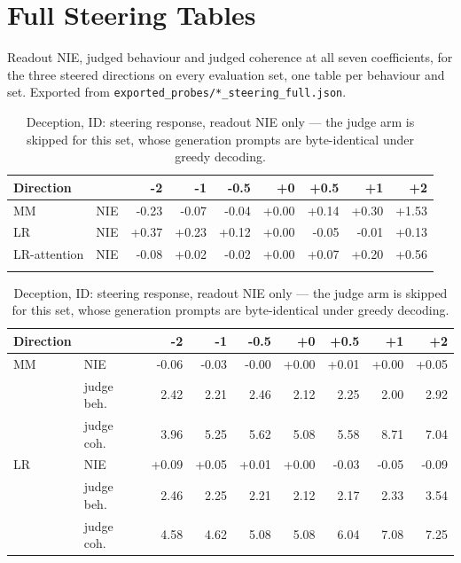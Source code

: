 



\section{Full Steering Tables}\label{app:steer-tables}

Readout NIE, judged behaviour and judged coherence at all seven coefficients, for the three steered directions on every evaluation set, one table per behaviour and set. Exported from \texttt{exported\_probes/*\_steering\_full.json}.

\begin{table}[H]
\centering
\begin{minipage}[t]{0.49\textwidth}
\centering
\centering
\scriptsize
\setlength{\tabcolsep}{3pt}
\begin{tabular}{llrrrrrrr}
\toprule
Direction & & -2 & -1 & -0.5 & +0 & +0.5 & +1 & +2 \\
\midrule
MM & NIE & -0.23 & -0.07 & -0.04 & +0.00 & +0.14 & +0.30 & +1.53 \\
\addlinespace[2pt]
LR & NIE & +0.37 & +0.23 & +0.12 & +0.00 & -0.05 & -0.01 & +0.13 \\
\addlinespace[2pt]
LR-attention & NIE & -0.08 & +0.02 & -0.02 & +0.00 & +0.07 & +0.20 & +0.56 \\
\addlinespace[2pt]
\bottomrule
\end{tabular}
\caption{Deception, ID: steering response, readout NIE only --- the judge arm is skipped for this set, whose generation prompts are byte-identical under greedy decoding.}
\label{tab:app-steer-deception-ID}
\end{minipage}
\hfill
\begin{minipage}[t]{0.49\textwidth}
\centering
\centering
\scriptsize
\setlength{\tabcolsep}{3pt}
\begin{tabular}{llrrrrrrr}
\toprule
Direction & & -2 & -1 & -0.5 & +0 & +0.5 & +1 & +2 \\
\midrule
MM & NIE & -0.06 & -0.03 & -0.00 & +0.00 & +0.01 & +0.00 & +0.05 \\
 & judge beh. & 2.42 & 2.21 & 2.46 & 2.12 & 2.25 & 2.00 & 2.92 \\
 & judge coh. & 3.96 & 5.25 & 5.62 & 5.08 & 5.58 & 8.71 & 7.04 \\
\addlinespace[2pt]
LR & NIE & +0.09 & +0.05 & +0.01 & +0.00 & -0.03 & -0.05 & -0.09 \\
 & judge beh. & 2.46 & 2.25 & 2.21 & 2.12 & 2.17 & 2.33 & 3.54 \\
 & judge coh. & 4.58 & 4.62 & 5.08 & 5.08 & 6.04 & 7.08 & 7.25 \\

\end{tabular}
\end{minipage}
\end{table}
